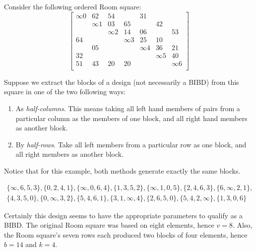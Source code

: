 Consider the following ordered Room square:
\begin{equation}
  \begin{bmatrix}
    \infty 0 &    62    &    54    &            &    31    &            &          \\
             & \infty 1 &    03    &     65     &          &     42     &          \\
             &          & \infty 2 &     14     &    06    &            &    53    \\
      64     &          &          &  \infty 3  &    25    &     10     &          \\
             &    05    &          &            & \infty 4 &     36     &    21    \\
      32     &          &          &            &          &  \infty 5  &    40    \\
      51     &    43    &    20    &     20     &          &            & \infty 6 \\
  \end{bmatrix}
  \label{eq:ors}
\end{equation}

Suppose we extract the blocks of a design (not necessarily a BIBD) from this square in one of the two following ways:

\begin{enumerate}
 \item{As \emph{half-columns}. This means taking all left hand
    members of pairs from a particular column as the members
    of one block, and all right hand members as another
    block.}
 \item{By \emph{half-rows}. Take all left members from a particular
    row as one block, and all right members as another
    block.}
\end{enumerate}

Notice that for this example, both methods generate exactly the same blocks.

\begin{equation}
\begin{split}
\{\infty,6,5,3\},\{0,2,4,1\},\{\infty,0,6,4\},\{1,3,5,2\},\{\infty,1,0,5\},\{2,4,6,3\},\{6, \infty,2,1\}, \\
\{4,3,5,0\},\{0,\infty,3,2\},\{5,4,6,1\},\{3,1,\infty,4\},\{2,6,5,0\},\{5,4,2,\infty\},\{1, 3,0,6\}
\end{split}
\end{equation}

Certainly this design seems to have the appropriate parameters to qualify as a BIBD.
The original Room square was based on eight elements, hence $v = 8$.
Also, the Room square’s seven rows each produced two blocks of four elements, hence $b = 14$ and $k = 4$.


